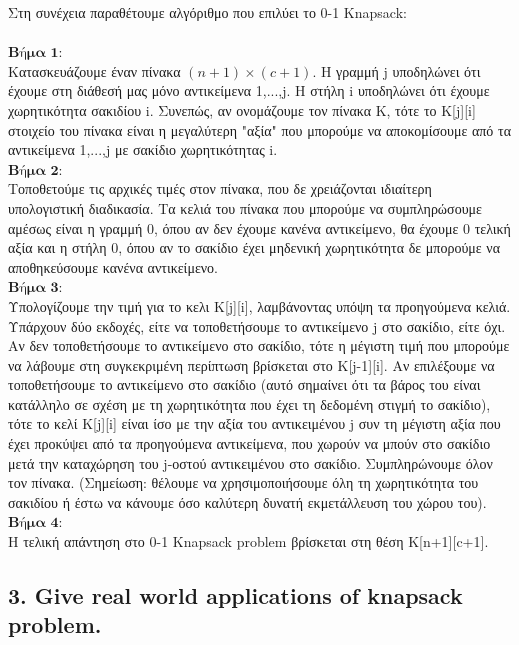 \documentclass[12pt]{article}
\begin{document}
Στη συνέχεια παραθέτουμε αλγόριθμο που επιλύει το 0-1 Knapsack: \\ \\

\(\textbf{Βήμα 1:}\) \\
Κατασκευάζουμε έναν πίνακα \((n+1) \times (c+1)\). Η γραμμή j υποδηλώνει ότι έχουμε στη διάθεσή μας μόνο αντικείμενα 1,...,j. Η στήλη i υποδηλώνει ότι έχουμε χωρητικότητα σακιδίου i. Συνεπώς, αν ονομάζουμε τον πίνακα Κ, τότε το Κ[j][i] στοιχείο του πίνακα είναι η μεγαλύτερη "αξία" που μπορούμε να αποκομίσουμε από τα αντικείμενα 1,...,j με σακίδιο χωρητικότητας i. \\
\(\textbf{Βήμα 2:}\) \\
Τοποθετούμε τις αρχικές τιμές στον πίνακα, που δε χρειάζονται ιδιαίτερη υπολογιστική διαδικασία. Τα κελιά του πίνακα που μπορούμε να συμπληρώσουμε αμέσως είναι η γραμμή 0, όπου αν δεν έχουμε κανένα αντικείμενο, θα έχουμε 0 τελική αξία και η στήλη 0, όπου αν το σακίδιο έχει μηδενική χωρητικότητα δε μπορούμε να αποθηκεύσουμε κανένα αντικείμενο. \\
\(\textbf{Βήμα 3:}\) \\
Υπολογίζουμε την τιμή για το κελι Κ[j][i], λαμβάνοντας υπόψη τα προηγούμενα κελιά. Υπάρχουν δύο εκδοχές, είτε να τοποθετήσουμε το αντικείμενο j στο σακίδιο, είτε όχι. Αν δεν τοποθετήσουμε το αντικείμενο στο σακίδιο, τότε η μέγιστη τιμή που μπορούμε να λάβουμε στη συγκεκριμένη περίπτωση βρίσκεται  στο Κ[j-1][i]. Αν επιλέξουμε να τοποθετήσουμε το αντικείμενο στο σακίδιο (αυτό σημαίνει ότι τα βάρος του είναι κατάλληλο σε σχέση με τη χωρητικότητα που έχει τη δεδομένη στιγμή το σακίδιο), τότε το κελί Κ[j][i] είναι ίσο με την αξία του αντικειμένου j συν τη μέγιστη αξία που έχει προκύψει από τα προηγούμενα αντικείμενα, που χωρούν να μπούν στο σακίδιο μετά την καταχώρηση του j-οστού αντικειμένου στο σακίδιο. Συμπληρώνουμε όλον τον πίνακα. (Σημείωση: θέλουμε να χρησιμοποιήσουμε όλη τη χωρητικότητα του σακιδίου ή έστω να κάνουμε όσο καλύτερη δυνατή εκμετάλλευση του χώρου του).  \\
\(\textbf{Βήμα 4:}\) \\
Η τελική απάντηση στο 0-1 Knapsack problem βρίσκεται στη θέση Κ[n+1][c+1].

\vspace{2in}

\pagebreak

\subsection*{3. Give real world applications of knapsack problem.}
\end{document}
